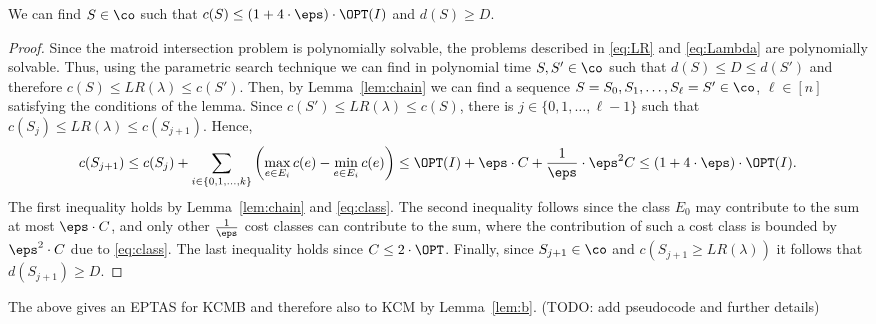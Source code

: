 \begin{lemma}
	\label{lem:EPTASbound}
	We can find $S \in \co$ such that $c(S) \leq (1+4 \cdot \eps) \cdot \OPT(I)$ and $d(S) \geq D$. 
\end{lemma}

\begin{proof}
	Since the matroid intersection problem is polynomially solvable, the problems described in \eqref{eq:LR} and \eqref{eq:Lambda} are polynomially solvable. Thus, using the parametric search technique \cite{megiddo1978combinatorial} we can find in polynomial time $S,S' \in \co$ such that $d(S) \leq D \leq d(S')$ and therefore $c(S) \leq LR(\lambda) \leq c(S')$. Then, by Lemma~\ref{lem:chain} we can find a sequence $S = S_0, S_1, \ldots, S_{\ell} = S' \in \co$, $\ell \in [n]$ satisfying the conditions of the lemma. Since $c(S') \leq LR(\lambda) \leq c(S)$, there is $j \in \{0,1,\ldots,\ell-1\}$ such that $c(S_j) \leq LR(\lambda) \leq c(S_{j+1})$. Hence, \begin{equation}
		\label{eq:2}
		c(S_{j+1}) \leq c(S_j)+\sum_{i \in \{0,1,\ldots,k\}} \left(\max_{e \in E_i} c(e) - \min_{e \in E_i} c(e)\right) \leq \OPT(I) + \eps \cdot C+ \frac{1}{\eps} \cdot \eps^2 C \leq (1+4 \cdot \eps) \cdot \OPT(I). 
	\end{equation} The first inequality holds by Lemma~\ref{lem:chain} and \eqref{eq:class}. The second inequality follows since the class $E_0$ may contribute to the sum at most $\eps \cdot C$, and only other $\frac{1}{\eps}$ cost classes can contribute to the sum, where the contribution of such a cost class is bounded by $\eps^2 \cdot C$ due to \eqref{eq:class}. The last inequality holds since $C \leq 2 \cdot \OPT$.  Finally, since $S_{j+1} \in \co$ and $c(S_{j+1} \geq LR(\lambda))$ it follows that $d(S_{j+1}) \geq D$. 
\end{proof}

The above gives an EPTAS for KCMB and therefore also to KCM by Lemma~\ref{lem:b}. 	(TODO: add pseudocode and further details)


